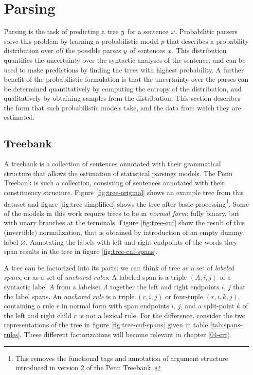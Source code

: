 \section{Parsing}
  Parsing is the task of predicting a tree $y$ for a sentence $x$. Probabilitic parsers solve this problem by learning a probabilistic model $p$ that describes a probability distribution over \textit{all} the possible parses $y$ of sentences $x$. This distribution quantifies the uncertainty over the syntactic analyses of the sentence, and can be used to make predictions by finding the trees with highest probability. A further benefit of the probabilistic formulation is that the uncertainty over the parses can be determined quantitatively by computing the entropy of the distribution, and qualitatively by obtaining samples from the distribution. This section describes the form that such probabilistic models take, and the data from which they are estimated.

  \subsection{Treebank}
    A treebank is a collection of sentences annotated with their grammatical structure that allows the estimation of statistical parsings models. The Penn Treebank \citep{marcus1993penn} is such a collection, consisting of sentences annotated with their constituency structure. Figure \ref{fig:tree-original} shows an example tree from this dataset and figure \ref{fig:tree-simplified} shows the tree after basic processing\footnote{This removes the functional tags and annotation of argument structure introduced in version 2 of the Penn Treebank \citep{marcus1994annotating}.}. Some of the models in this work require trees to be in \textit{normal form}: fully binary, but with unary branches at the terminals. Figure \ref{fig:tree-cnf} show the result of this (invertible) normalization, that is obtained by introduction of an empty dummy label $\varnothing$. Annotating the labels with left and right endpoints of the words they span results in the tree in figure \ref{fig:tree-cnf-spans}.

    A tree can be factorized into its parts: we can think of tree as a set of \textit{labeled spans}, or as a set of \textit{anchored rules}. A labeled span is a triple $(A, i, j)$ of a syntactic label $A$ from a labelset $\Lambda$ together the left and right endpoints $i$, $j$ that the label spans. An \textit{anchored rule} is a triple $(r, i, j)$ or four-tuple $(r, i, k, j)$, containing a rule $r$ in normal form with span endpoints $i$, $j$, and a split-point $k$ of the left and right child $r$ is not a lexical rule. For the difference, consider the two representations of the tree in figure \ref{fig:tree-cnf-spans} given in table \ref{tab:spans-rules}. These different factorizations will become relevant in chapter \ref{04-crf}.

